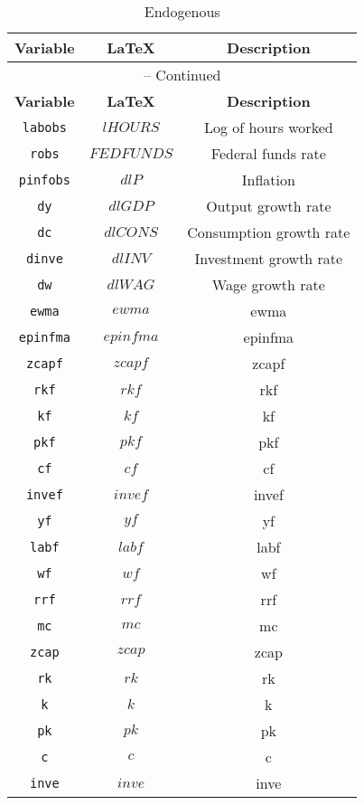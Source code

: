 \begin{center}
\begin{longtable}{ccc}
\caption{Endogenous}\\%
\hline%
\multicolumn{1}{c}{\textbf{Variable}} &
\multicolumn{1}{c}{\textbf{\LaTeX}} &
\multicolumn{1}{c}{\textbf{Description}}\\%
\hline\hline%
\endfirsthead
\multicolumn{3}{c}{{\tablename} \thetable{} -- Continued}\\%
\hline%
\multicolumn{1}{c}{\textbf{Variable}} &
\multicolumn{1}{c}{\textbf{\LaTeX}} &
\multicolumn{1}{c}{\textbf{Description}}\\%
\hline\hline%
\endhead
\texttt{labobs} & ${lHOURS}$ & Log of hours worked\\
\texttt{robs} & ${FEDFUNDS}$ & Federal funds rate\\
\texttt{pinfobs} & ${dlP}$ & Inflation\\
\texttt{dy} & ${dlGDP}$ & Output growth rate\\
\texttt{dc} & ${dlCONS}$ & Consumption growth rate\\
\texttt{dinve} & ${dlINV}$ & Investment growth rate\\
\texttt{dw} & ${dlWAG}$ & Wage growth rate\\
\texttt{ewma} & $ewma$ & ewma\\
\texttt{epinfma} & $epinfma$ & epinfma\\
\texttt{zcapf} & $zcapf$ & zcapf\\
\texttt{rkf} & $rkf$ & rkf\\
\texttt{kf} & $kf$ & kf\\
\texttt{pkf} & $pkf$ & pkf\\
\texttt{cf} & $cf$ & cf\\
\texttt{invef} & $invef$ & invef\\
\texttt{yf} & $yf$ & yf\\
\texttt{labf} & $labf$ & labf\\
\texttt{wf} & $wf$ & wf\\
\texttt{rrf} & $rrf$ & rrf\\
\texttt{mc} & $mc$ & mc\\
\texttt{zcap} & $zcap$ & zcap\\
\texttt{rk} & $rk$ & rk\\
\texttt{k} & $k$ & k\\
\texttt{pk} & $pk$ & pk\\
\texttt{c} & $c$ & c\\
\texttt{inve} & $inve$ & inve\\

\end{longtable}
\end{center}
